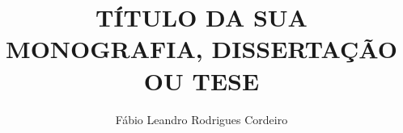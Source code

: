 


\newcommand{\monog}{%
TÍTULO DA SUA MONOGRAFIA, DISSERTAÇÃO OU TESE
}
\title{\monog}
\newcommand{\por}{%
Fábio Leandro Rodrigues Cordeiro
}
\author{\por}

\newcommand{\subtitulo}{subtítulo deve começar em letra minúscula}

\newcommand{\univ}{\hspace{0.1cm}Pontifícia \hspace{0.1cm}Universidade\hspace{0.1cm} Católica \hspace{0.1cm}de\hspace{0.2cm} Minas\hspace{0.2cm} Gerais}

\newcommand{\curso}{\hspace{0.1cm} Programa \hspace{0.1cm} de \hspace{0.1cm} Pós-graduação\hspace{0.1cm} em \hspace{0.1cm} Engenharia Elétrica}

\newcommand{\grau}{Mestre em  Engenharia Elétrica }
\newcommand{\tipo}{Dissertação}

\newcommand{\profOrientador}{Prof. Nome do Professor}
\newcommand{\profA}{Prof. Nome do Avaliador}
\newcommand{\profB}{Prof. Nome do Avaliador}

\newcommand{\cidade}{Belo Horizonte}

\newcommand{\ano}{2013}

\newcommand{\dataCompleta}{30 de Outubro de 2013}
